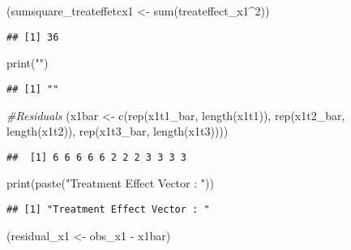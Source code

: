 \documentclass[
]{article}
\newenvironment{Shaded}{\begin{snugshade}}{\end{snugshade}}
\newcommand{\CommentTok}[1]{\textcolor[rgb]{0.56,0.35,0.01}{\textit{#1}}}
\newcommand{\DecValTok}[1]{\textcolor[rgb]{0.00,0.00,0.81}{#1}}
\newcommand{\FunctionTok}[1]{\textcolor[rgb]{0.00,0.00,0.00}{#1}}
\newcommand{\NormalTok}[1]{#1}
\newcommand{\OtherTok}[1]{\textcolor[rgb]{0.56,0.35,0.01}{#1}}
\newcommand{\SpecialCharTok}[1]{\textcolor[rgb]{0.00,0.00,0.00}{#1}}
\newcommand{\StringTok}[1]{\textcolor[rgb]{0.31,0.60,0.02}{#1}}
\begin{document}
\begin{Shaded}
\begin{Highlighting}[]
\NormalTok{(sumsquare\_treateffetcx1 }\OtherTok{\textless{}{-}} \FunctionTok{sum}\NormalTok{(treateffect\_x1}\SpecialCharTok{\^{}}\DecValTok{2}\NormalTok{)) }
\end{Highlighting}
\end{Shaded}

\begin{verbatim}
## [1] 36
\end{verbatim}

\begin{Shaded}
\begin{Highlighting}[]
\FunctionTok{print}\NormalTok{(}\StringTok{""}\NormalTok{)}
\end{Highlighting}
\end{Shaded}

\begin{verbatim}
## [1] ""
\end{verbatim}

\begin{Shaded}
\begin{Highlighting}[]
\CommentTok{\#Residuals}
\NormalTok{(x1bar }\OtherTok{\textless{}{-}} \FunctionTok{c}\NormalTok{(}\FunctionTok{rep}\NormalTok{(x1t1\_bar, }\FunctionTok{length}\NormalTok{(x1t1)), }
                \FunctionTok{rep}\NormalTok{(x1t2\_bar, }\FunctionTok{length}\NormalTok{(x1t2)), }
                \FunctionTok{rep}\NormalTok{(x1t3\_bar, }\FunctionTok{length}\NormalTok{(x1t3))))}
\end{Highlighting}
\end{Shaded}

\begin{verbatim}
##  [1] 6 6 6 6 6 2 2 2 3 3 3 3
\end{verbatim}

\begin{Shaded}
\begin{Highlighting}[]
\FunctionTok{print}\NormalTok{(}\FunctionTok{paste}\NormalTok{(}\StringTok{"Treatment Effect Vector : "}\NormalTok{))}
\end{Highlighting}
\end{Shaded}

\begin{verbatim}
## [1] "Treatment Effect Vector : "
\end{verbatim}

\begin{Shaded}
\begin{Highlighting}[]
\NormalTok{(residual\_x1 }\OtherTok{\textless{}{-}}\NormalTok{ obs\_x1 }\SpecialCharTok{{-}}\NormalTok{ x1bar)}
\end{Highlighting}
\end{Shaded}
\end{document}
